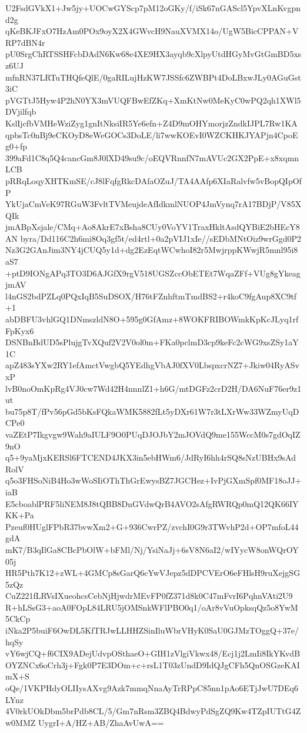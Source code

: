 U2FsdGVkX1+Jw5jy+UOCwGYScp7pM12oGKy/f/iSk67nGAScl5YpvXLnKvgpnd2g
qKeBKJFxO7HzAm0POx9oyX2X4GWvcH9NauXVMX14o/UgW5BicCPPAN+VRP7dBN4r
pU0SrgChRTSSHFcbDAdN6Kw68e4XE9HX3ayqb9cXlpyUtdHGyMvGtGmBD5xsz6UJ
mfnRN37LRTuTHQfeQlE/0gaRILujHzKW7JSSfc6ZWBPt4DoLBxwJLy0AGuGst3iC
pVGTtJ5Hyw4P2hN0YX3mVUQFBwEfZKq+XmKtNw0MeKyC0wPQ2qh1XWl5DVjilfqb
KslIjcfbVMHeWziZyg1gnItNksiIR5Ye6efn+Z4D9mOHYmorjzZndkIJPL7Rw1KA
qpbsTc0nBj9eCKOyD8eWeGOCs3DoLE/li7wwKOEvI0WZCKHKJYAPjn4CpoEg0+fp
399aFd1C8q5Q4cancGm8J0lXD49su9c/oEQVRnnfN7mAVUc2GX2PpE+x8xqmnLCB
pRRqLoqyXHTKmSE/cJ8lFqfgRkcDAfaOZuJ/TA4AAfp6XIaRalvfw5vBopQIpOfP
YkUjaCmVeK97RGuW3FvltTVMeujdeAfIdkmlNUOP4JmVynq7rA17BDjP/V85XQIk
jmABpXsjale/CMq+Ao8AkrE7xBsha8CUy0VoYV1TraxHkltAsdQYBiE2bHEcY8AN
byra/Dd116C2h6mi8Oq3gf5t/ed4rtl+0a2pVIJ1xIe//sEDbMNtOiz9wrGgd0P2
Nz3G2GAnJim3NY4jCUQ5y1d+dg2EzEqtWCwhoI82r5MwjrppKWwjR5mnl95i8aS7
+ptD9IONgAPq3TO3D6AJGfX9rgV518UGSZccObETEt7WqaZFf+VUg8gYkeagjmAV
l4nGS2bdPZLq0PQxIqB5SuDSOX/H76tFZnhftmTmdBS2+r4koC9fgAup8XC9tf+1
abDBFU3vhlGQ1DNmszldN8O+595g0GfAmz+8WOKFRIBOWmkKpKcJLyq1rfFpKyx6
DSNBnBdUD5sPlujgTvXQuf2V2V0ol0m+FKa0pclmD3cp9keFc2cWG9xsZSy1aY1C
apZ483sYXw2RY1efAmctVwgbQ5YEdhgVbAJ0fXV0LbspxcrNZ7+Jkiw04RyASvxP
lvB0noOmKpRg4VJ0cw7Wd42H4nnnlZ1+h6G/mtDGFz2crD2H/DA6NuF76er9z1ut
bu75p8T/fPv56pGd5bKsFQkaWMK5882fLt5yDXr61W7r3tLXrWw33WZmyUqDCPe0
vaZEtP7Ikgvgw9Wah9aIULF9O0PUqDJOJbY2mJOVdQ9me155WccM0s7gdOqIZ9nO
q5+9yaMjxKERSl6FTCEND4JKX3in5ebHWm6/JdRyI6hh4rSQ8sNzUBHx9sAdRolV
q5o3FHSoNiB4Ho3wWoSIiOThThGrEwysBZ7JGCHez+IvPjGXmSpf0MF18oJJ+iaB
E5cboablPRF5liNEM8J8tQBB8DnGVdwQrB4AVO2sAfgRWRQp0mQ12QK66IYKK+Pa
Pzeuf0HUglFPbR37bvwXm2+G+936CwrPZ/zvchI0G9r3TWvhP2d+OP7mfoL44gdA
mK7/B3qIlGa8CBcPbOlW+bFMl/Nj/YsiNaJj+6sV8N6aI2/wIYycW8onWQrOY05j
HR5Pth7K12+zWL+4GMCp8sGarQ6cYwVJepz5dDPCVErO6eFHlsH9ruXejgSG5zQz
CuZ221fLRVsIXueohcsCebNjHjwdrMEvFP0fZ371d8k0C47mFvrI6PqhnVAti2U9
R+hLSsG3+aoA0FOpL84LRU5jOMSnkWFlPBO0q1/oAr8vVuOpksqQz5o8YwM5CkCp
iNka2P5buiF6OwDL5KfTRJwLLHHZSinIluWbrVHyK0SaU0GJMzTOggQ+37e/hqSy
vY6wjCQ+f6CIX9ADejUdvpOSthaeO+GIH1zVlgiVkwx48/Ecj1j2LmIi8IkYKvdB
OYZNCx6oCrh3j+Fgk0P7E3DOm+c+rsL1T03zUndD9IdQJgCFh5QnOSGzeKAImX+S
oQe/1VKPHdyOLIIysAXvg9Azk7mmqNnaAyTrRPpC85nn1pAo6ETjJwU7DEq6LYnz
4V0rkUOkDbm5brPdb8CL/5/Gm7nRsm3ZBQ4BdwyPdSgZQ9Kw4TZpIUTtG4Zw0MMZ
UygrI+A/HZ+AB/ZhaAvUwA==
